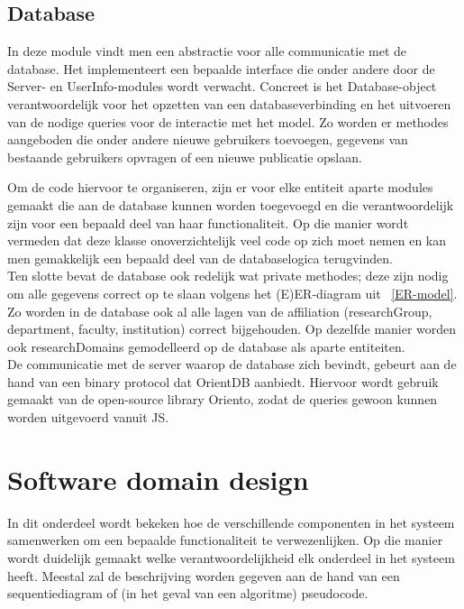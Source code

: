 \documentclass{article}
\begin{document}
\subsection{Database}

In deze module vindt men een abstractie voor alle communicatie met de database. Het implementeert een bepaalde interface die onder andere door de Server- en UserInfo-modules wordt verwacht. Concreet is het Database-object verantwoordelijk voor het opzetten van een databaseverbinding en het uitvoeren van de nodige queries voor de interactie met het model. Zo worden er methodes aangeboden die onder andere nieuwe gebruikers toevoegen, gegevens van bestaande gebruikers opvragen of een nieuwe publicatie opslaan.

Om de code hiervoor te organiseren, zijn er voor elke entiteit aparte modules gemaakt die aan de database kunnen worden toegevoegd en die verantwoordelijk zijn voor een bepaald deel van haar functionaliteit. Op die manier wordt vermeden dat deze klasse onoverzichtelijk veel code op zich moet nemen en kan men gemakkelijk een bepaald deel van de databaselogica terugvinden. \\

Ten slotte bevat de database ook redelijk wat private methodes; deze zijn nodig om alle gegevens correct op te slaan volgens het (E)ER-diagram uit ~\ref{ER-model}. Zo worden in de database ook al alle lagen van de affiliation (researchGroup, department, faculty, institution) correct bijgehouden. Op dezelfde manier worden ook researchDomains gemodelleerd op de database als aparte entiteiten.\\

De communicatie met de server waarop de database zich bevindt, gebeurt aan de hand van een binary protocol dat OrientDB aanbiedt. Hiervoor wordt gebruik gemaakt van de open-source library Oriento, zodat de queries gewoon kunnen worden uitgevoerd vanuit JS. 

\clearpage

\section{Software domain design}

In dit onderdeel wordt bekeken hoe de verschillende componenten in het systeem samenwerken om een bepaalde functionaliteit te verwezenlijken. Op die manier wordt duidelijk gemaakt welke verantwoordelijkheid elk onderdeel in het systeem heeft.
Meestal zal de beschrijving worden gegeven aan de hand van een sequentiediagram of (in het geval van een algoritme) pseudocode.
\end{document}
